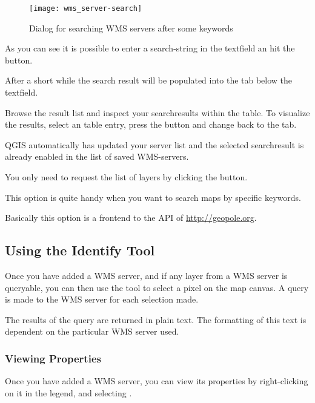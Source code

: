 \begin{figure}[ht]
  \centering
  \texttt{[image: wms\_server-search]}
  	\caption{Dialog for searching WMS servers after some keywords \nixcaption}\label{fig:searchtab}
\end{figure}

As you can see it is possible to enter a search-string in the textfield an
hit the  button.

After a short while the search result will be populated into the tab below
the textfield. 

Browse the result list and inspect your searchresults within the table. To
visualize the results, select an table entry, press the  button and change back to the  tab.

QGIS automatically has updated your server list and the selected
searchresult is already enabled in the list of saved WMS-servers.

You only need to request the list of layers by clicking the
 button.

This option is quite handy when you want to search maps by specific
keywords.

Basically this option is a frontend to the API of
\url{http://geopole.org}.

\subsection{Using the Identify Tool}\label{sec:ogc-wms-identify}

Once you have added a WMS server, 
and if any layer from a WMS server is queryable, you can then use
the  tool to select a pixel on the map canvas.
A query is made to the WMS server for each selection made.

The results of the query are returned in plain text.
The formatting of this text is dependent on the particular
WMS server used.

\subsubsection{Viewing Properties}\label{sec:ogc-wms-properties}

Once you have added a WMS server, you can view its properties
by right-clicking on it in the legend, and selecting
.


